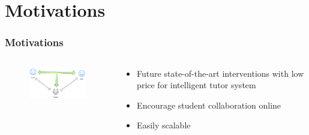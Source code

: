 \documentclass{beamer}
\begin{document}

\section{Motivations} %
\begin{frame}
\frametitle{Motivations}
\begin{columns}
	\begin{column}{.55\textwidth}
		\begin{figure}
			\includegraphics[width=55mm]{m1.png}
		\end{figure}

	\end{column}
	
	\begin{column}{.55\textwidth}
		\begin{itemize}
			\item Future state-of-the-art interventions with low price for intelligent tutor system
			\item Encourage student collaboration online
			\item Easily scalable 
		
			
		\end{itemize}
	\end{column}
\end{columns}
\end{frame}
\end{document}
